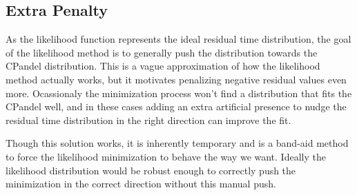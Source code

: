 \subsection{Extra Penalty}

As the likelihood function represents the ideal residual time distribution, the goal of the likelihood method is to generally push the distribution towards the CPandel distribution. This is a vague approximation of how the likelihood method actually works, but it motivates penalizing negative residual values even more. Ocassionaly the minimization process won't find a distribution that fits the CPandel well, and in these cases adding an extra artificial presence to nudge the residual time distribution in the right direction can improve the fit.

Though this solution works, it is inherently temporary and is a band-aid method to force the likelihood minimization to behave the way we want. Ideally the likelihood distribution would be robust enough to correctly push the minimization in the correct direction without this manual push. 
